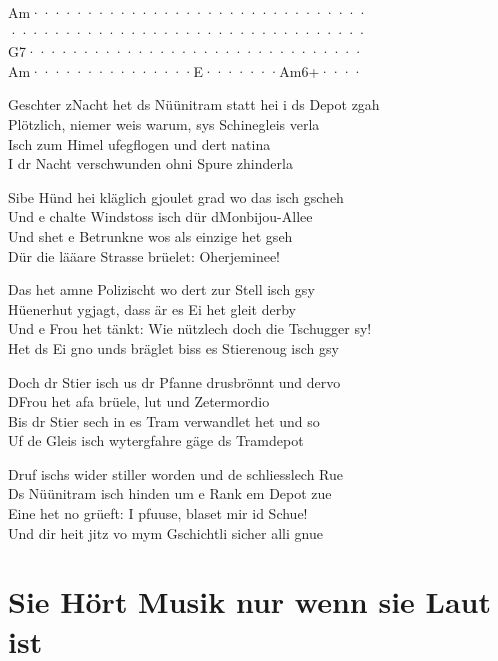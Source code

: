 \documentclass[
  letterpaper,
  twoside=false]{scrbook}
\begin{document}
\textbar Am·······\textbar········\textbar········\textbar········\textbar{}\\
\textbar·········\textbar········\textbar········\textbar········\textbar{}\\
\textbar G7·······\textbar········\textbar········\textbar········\textbar{}\\
\textbar Am·······\textbar········\textbar E·······\textbar Am6+····\textbar{}

Geschter z\textquotesingle Nacht het ds Nüünitram statt hei i ds Depot
z\textquotesingle gah\\
Plötzlich, niemer weis warum, sys Schinegleis verla\\
Isch zum Himel ufegflogen und dert natina\\
I dr Nacht verschwunden ohni Spure z\textquotesingle hinderla

Sibe Hünd hei kläglich gjoulet grad wo das isch gscheh\\
Und e chalte Windstoss isch dür d\textquotesingle Monbijou-Allee\\
Und s\textquotesingle het e Betrunkne wos als einzige het gseh\\
Dür die lääare Strasse brüelet: Oherjeminee!

Das het amne Polizischt wo dert zur Stell isch gsy\\
Hüenerhut ygjagt, dass är es Ei het gleit derby\\
Und e Frou het tänkt: Wie nützlech doch die Tschugger sy!\\
Het ds Ei gno und\textquotesingle s bräglet bis\textquotesingle s es
Stierenoug isch gsy

Doch dr Stier isch us dr Pfanne drusbrönnt und dervo\\
D\textquotesingle Frou het afa brüele, lut und Zetermordio\\
Bis dr Stier sech in es Tram verwandlet het und so\\
Uf de Gleis isch wytergfahre gäge ds Tramdepot

Druf ischs wider stiller worden und de schliesslech Rue\\
Ds Nüünitram isch hinden um e Rank em Depot zue\\
Eine het no grüeft: I pfuuse, blaset mir id Schue!\\
Und dir heit jitz vo mym Gschichtli sicher alli gnue

\hypertarget{sie-huxf6rt-musik-nur-wenn-sie-laut-ist}{%
\chapter{Sie Hört Musik nur wenn sie Laut
ist}\label{sie-huxf6rt-musik-nur-wenn-sie-laut-ist}}
\end{document}
